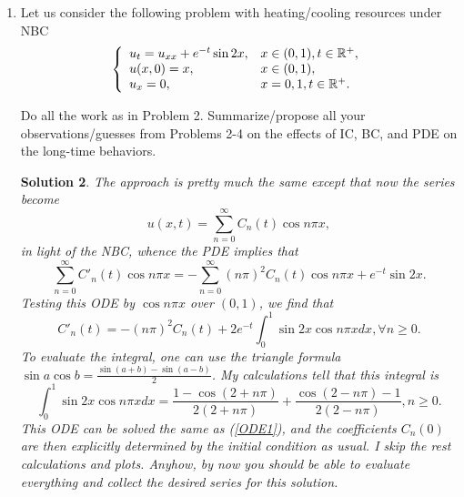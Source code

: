 \documentclass[6pt]{article}
\newtheorem{solution}{Solution}
\numberwithin{equation}{section}
\def\mathbb{\Bbb}
\begin{document}
\begin{enumerate}
\begin{solution}
Indeed, one does not need to know this technique to the end, and let me show you how.  Let us denote for notational simplicity that $\lambda:=4\pi^2$.   Then we agree that (\ref{ODE1}) can be rewritten as $(e^{\lambda t}C_2(t))'e^{-\lambda t}=e^{t}$, or equivalently
\[\big(e^{\lambda t}C_2(t)\big)'=e^{(\lambda -1)t}.\]
Integrating this identity over $(0,t)$ gives us
\[C_2(t)=C_2(0)e^{-\lambda t}+\frac{1}{\lambda -1}\Big(e^{-t}-e^{-\lambda t}\Big)=C_2(0)e^{-4\pi^2 t}+\frac{1}{4\pi^2 -1}\Big(e^{-t}-e^{-4\pi^2 t}\Big).\]
Then the solution can be rewritten into the following series
\[u(x,t)=C_2(t)\sin 2\pi x+\sum_{n\neq2}C_n(t)\sin n\pi x,\]
where $C_n(0)$, $n\geq1$, are determined by the initial condition as
\[C_n(0)=2\int_0^1 x\sin n\pi xdx=\frac{2}{n\pi}(-1)^{n-1}, \forall n\geq1.\]
\end{solution}


\item  Let us consider the following problem with heating/cooling resources under NBC
\begin{equation}\label{NBVP1}
\left\{
\begin{array}{ll}
u_t=u_{xx}+e^{-t}\sin 2x,& x\in (0,1), t\in\mathbb R^+,\\
u(x,0)=x, &x\in(0,1), \\
u_x=0, & x=0,1, t\in\mathbb R^+.
\end{array}
\right.
\end{equation}

Do all the work as in Problem 2.  Summarize/propose all your observations/guesses from Problems 2-4 on the effects of IC, BC, and PDE on the long-time behaviors.
\begin{solution}
The approach is pretty much the same except that now the series become
\[u(x,t)=\sum_{n=0}^\infty C_n(t)\cos n\pi x,\]
in light of the NBC, whence the PDE implies that
\[\sum_{n=0}^\infty C'_n(t)\cos n\pi x=-\sum_{n=0}^\infty(n\pi)^2C_n(t)\cos n\pi x+e^{-t}\sin 2x.\]
Testing this ODE by $\cos n\pi x$ over $(0,1)$, we find that
\[C'_n(t)=-(n\pi)^2C_n(t)+2e^{-t}\int_0^1\sin 2x \cos n\pi xdx, \forall n\geq0.\]
To evaluate the integral, one can use the triangle formula $\sin a \cos b=\frac{\sin(a+b)-\sin(a-b)}{2}$.  My calculations tell that this integral is
\[\int_0^1\sin 2x \cos n\pi xdx=\frac{1-\cos (2+n\pi)}{2(2+n\pi)}+\frac{\cos(2-n\pi)-1}{2(2-n\pi)},n\geq0.\]
This ODE can be solved the same as (\ref{ODE1}), and the coefficients $C_n(0)$ are then explicitly determined by the initial condition as usual.  I skip the rest calculations and plots.  Anyhow, by now you should be able to evaluate everything and collect the desired series for this solution.
\end{solution}


\end{enumerate}
\end{document}
